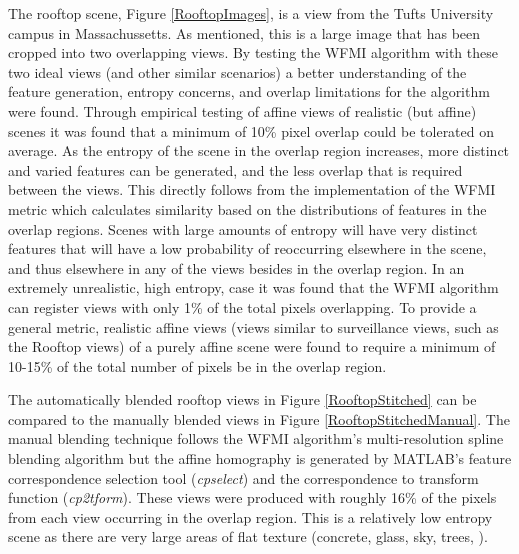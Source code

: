%
%
%
%
%
%
%
%
%

%
%
%



The rooftop scene, Figure \ref{RooftopImages}, is a view from the Tufts University campus in Massachussetts. As mentioned, this is a large image that has been cropped into two overlapping views. By testing the WFMI algorithm with these two ideal views (and other similar scenarios) a better understanding of the feature generation, entropy concerns, and overlap limitations for the algorithm were found. Through empirical testing of affine views of realistic (but affine) scenes it was found that a minimum of 10\% pixel overlap could be tolerated on average. As the entropy of  the scene in the overlap region increases, more distinct and varied features can be generated, and the less overlap that is required between the views. This directly follows from the implementation of the WFMI metric which calculates similarity based on the distributions of features in the overlap regions. Scenes with large amounts of entropy will have very distinct features that will have a low probability of reoccurring elsewhere in the scene, and thus elsewhere in any of the views besides in the overlap region. In an extremely unrealistic, high entropy, case it was found that the WFMI algorithm can register views with only 1\% of the total pixels overlapping. To provide a general metric, realistic affine views (views similar to surveillance views, such as the Rooftop views) of a purely affine scene were found to require a minimum of 10-15\% of the total number of pixels be in the overlap region.

The automatically blended rooftop views in Figure \ref{RooftopStitched} can be compared to the manually blended views in Figure \ref{RooftopStitchedManual}. The manual blending technique follows the WFMI algorithm's multi-resolution spline blending algorithm but the affine homography is generated by MATLAB\textsuperscript{\textregistered}'s feature correspondence selection tool (\textit{cpselect}) and the correspondence to transform function (\textit{cp2tform}). These views were produced with roughly 16\% of the pixels from each view occurring in the overlap region. This is a relatively low entropy scene as there are very large areas of flat texture (concrete, glass, sky, trees, \etc).

